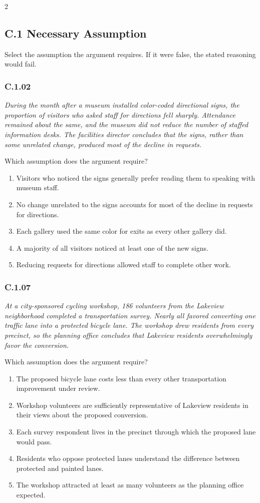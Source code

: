 \documentclass[10pt]{extarticle}
\newcommand{\choice}[1]{\item #1}
\newcommand{\bankitem}[1]{\subsubsection*{#1}}
\begin{document}
\begin{multicols}{2}
\subsection*{C.1 Necessary Assumption}
Select the assumption the argument requires. If it were false, the stated reasoning would fail.
\begin{samepage}
\bankitem{C.1.02}
\emph{During the month after a museum installed color-coded directional signs, the proportion of visitors who asked staff for directions fell sharply. Attendance remained about the same, and the museum did not reduce the number of staffed information desks. The facilities director concludes that the signs, rather than some unrelated change, produced most of the decline in requests.}

Which assumption does the argument require?
\begin{enumerate}[label=(\alph*)]
  \choice{Visitors who noticed the signs generally prefer reading them to speaking with museum staff.}
  \choice{No change unrelated to the signs accounts for most of the decline in requests for directions.}
  \choice{Each gallery used the same color for exits as every other gallery did.}
  \choice{A majority of all visitors noticed at least one of the new signs.}
  \choice{Reducing requests for directions allowed staff to complete other work.}
\end{enumerate}
\end{samepage}\par\smallskip
\begin{samepage}
\bankitem{C.1.07}
\emph{At a city-sponsored cycling workshop, 186 volunteers from the Lakeview neighborhood completed a transportation survey. Nearly all favored converting one traffic lane into a protected bicycle lane. The workshop drew residents from every precinct, so the planning office concludes that Lakeview residents overwhelmingly favor the conversion.}

Which assumption does the argument require?
\begin{enumerate}[label=(\alph*)]
  \choice{The proposed bicycle lane costs less than every other transportation improvement under review.}
  \choice{Workshop volunteers are sufficiently representative of Lakeview residents in their views about the proposed conversion.}
  \choice{Each survey respondent lives in the precinct through which the proposed lane would pass.}
  \choice{Residents who oppose protected lanes understand the difference between protected and painted lanes.}
  \choice{The workshop attracted at least as many volunteers as the planning office expected.}
\end{enumerate}
\end{samepage}\par\smallskip

\end{multicols}
\end{document}
